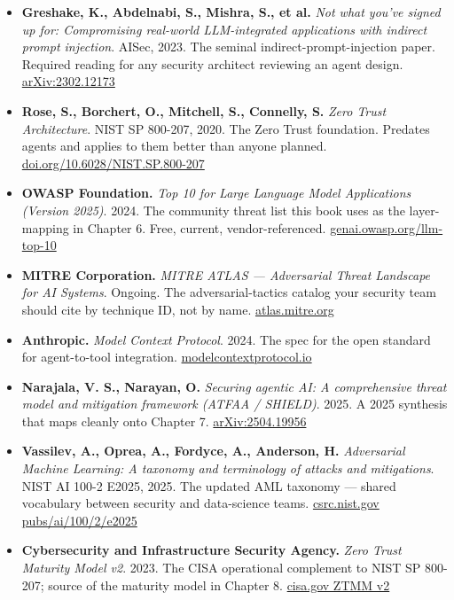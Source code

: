 \begin{itemize}
\item \textbf{Greshake, K., Abdelnabi, S., Mishra, S., et al.} \textit{Not what you've signed up for: Compromising real-world LLM-integrated applications with indirect prompt injection}. AISec, 2023. The seminal indirect-prompt-injection paper. Required reading for any security architect reviewing an agent design. \href{https://arxiv.org/abs/2302.12173}{arXiv:2302.12173}

\item \textbf{Rose, S., Borchert, O., Mitchell, S., Connelly, S.} \textit{Zero Trust Architecture}. NIST SP 800-207, 2020. The Zero Trust foundation. Predates agents and applies to them better than anyone planned. \href{https://doi.org/10.6028/NIST.SP.800-207}{doi.org/10.6028/NIST.SP.800-207}

\item \textbf{OWASP Foundation.} \textit{Top 10 for Large Language Model Applications (Version 2025)}. 2024. The community threat list this book uses as the layer-mapping in Chapter 6. Free, current, vendor-referenced. \href{https://genai.owasp.org/llm-top-10/}{genai.owasp.org/llm-top-10}

\item \textbf{MITRE Corporation.} \textit{MITRE ATLAS --- Adversarial Threat Landscape for AI Systems}. Ongoing. The adversarial-tactics catalog your security team should cite by technique ID, not by name. \href{https://atlas.mitre.org/}{atlas.mitre.org}

\item \textbf{Anthropic.} \textit{Model Context Protocol}. 2024. The spec for the open standard for agent-to-tool integration. \href{https://modelcontextprotocol.io/}{modelcontextprotocol.io}

\item \textbf{Narajala, V. S., Narayan, O.} \textit{Securing agentic AI: A comprehensive threat model and mitigation framework (ATFAA / SHIELD)}. 2025. A 2025 synthesis that maps cleanly onto Chapter 7. \href{https://arxiv.org/abs/2504.19956}{arXiv:2504.19956}

\item \textbf{Vassilev, A., Oprea, A., Fordyce, A., Anderson, H.} \textit{Adversarial Machine Learning: A taxonomy and terminology of attacks and mitigations}. NIST AI 100-2 E2025, 2025. The updated AML taxonomy --- shared vocabulary between security and data-science teams. \href{https://csrc.nist.gov/pubs/ai/100/2/e2025/final}{csrc.nist.gov pubs/ai/100/2/e2025}

\item \textbf{Cybersecurity and Infrastructure Security Agency.} \textit{Zero Trust Maturity Model v2}. 2023. The CISA operational complement to NIST SP 800-207; source of the maturity model in Chapter 8. \href{https://www.cisa.gov/sites/default/files/2023-04/zero_trust_maturity_model_v2_508.pdf}{cisa.gov ZTMM v2}
\end{itemize}

